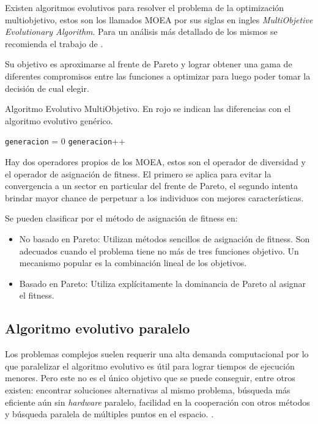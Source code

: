 Existen algoritmos evolutivos para resolver el problema de la optimización multiobjetivo, estos son los llamados MOEA por sus siglas en ingles \emph{ MultiObjetive Evolutionary Algorithm}. Para un análisis más detallado de los mismos se recomienda el trabajo de \citet{Deb2001}.

Su objetivo es aproximarse al frente de Pareto y lograr obtener una gama de diferentes compromisos entre las funciones a optimizar para luego poder tomar la decisión de cual elegir.


\begin{algorithm}%
	\caption{Algoritmo Evolutivo MultiObjetivo. En rojo se indican las diferencias con el algoritmo evolutivo genérico.}
	\label{alg:algoritmo_genetico_multiobjetivo}
	\begin{algorithmic} [1] 
		{
			\STATE \texttt{generacion} = 0
			\STATE {\textcolor{red}{Operador Diversidad (Pob(generacion))}}
			\STATE {\textcolor{red}{Asignar Fitness (Pob(generacion))}}
			\STATE \texttt{generacion}++
			\ENDWHILE
			\RETURN 	{\textcolor{red}{Frente de Pareto}}
		}
	\end{algorithmic}
\end{algorithm}

Hay dos operadores propios de los MOEA, estos son el operador de diversidad y el operador de asignación de fitness. El primero se aplica para evitar la convergencia a un sector en particular del frente de Pareto, el segundo intenta brindar mayor chance de perpetuar a los individuos con mejores características.

Se pueden clasificar por el método de asignación de fitness en:
\begin{itemize}
	\item No basado en Pareto: Utilizan métodos sencillos de asignación de fitness. Son adecuados cuando el problema tiene no más de tres funciones objetivo. Un mecanismo popular es la combinación lineal de los objetivos.
	\item Basado en Pareto: Utiliza explícitamente la dominancia de Pareto al asignar el fitness.
\end{itemize}



\subsection{Algoritmo evolutivo paralelo}
Los problemas complejos suelen requerir una alta demanda computacional por lo que paralelizar el algoritmo evolutivo es útil para lograr tiempos de ejecución menores. Pero este no es el único objetivo que se puede conseguir, entre otros existen: encontrar soluciones alternativas al mismo problema, búsqueda más eficiente aún sin \emph{hardware} paralelo, facilidad en la cooperación con otros métodos y búsqueda paralela de múltiples puntos en el espacio. \citep{Alba2002}. 

